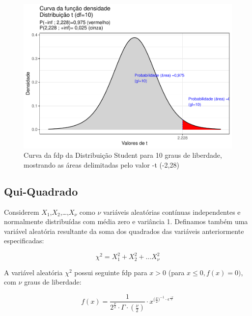 \documentclass[
]{book}
\begin{document}
\begin{figure}

{\centering \includegraphics{apostila_files/figure-latex/fig29-1} 

}

\caption{Curva da fdp da Distribuição Student para 10 graus de liberdade, mostrando as áreas delimitadas pelo valor -t (-2,28)}\label{fig:fig29}
\end{figure}

\hypertarget{qui-quadrado}{%
\subsection{Qui-Quadrado}\label{qui-quadrado}}

\hfill\break

Considerem \(X_{1}\),\(X_{2}\),\ldots,\(X_{\nu}\) como \(\nu\) variáveis aleatórias contínuas independentes e normalmente distribuídas com média zero e variância 1. Definamos também uma variável aleatória resultante da soma dos quadrados das variáveis anteriormente especificadas:

\hfill\break

\[
\chi^{2} = X_{1}^{2} + X_{2}^{2}+...X_{\nu}^{2}
\]

\hfill\break

A variável aleatória \(\chi^{2}\) possui seguinte fdp para \(x > 0\) (para \(x\le 0, f(x) = 0)\), com \(\nu\) graus de liberdade:

\hfill\break

\[
f(x) = \frac{1}{{2}^{\frac{\nu}{2}} \cdot \Gamma \cdot  (\frac{\nu}{2})} \cdot {x}^{ {(\frac{\nu}{2}})^{-1} \cdot \epsilon ^{\frac{-\nu}{2}} }
\]
\end{document}
